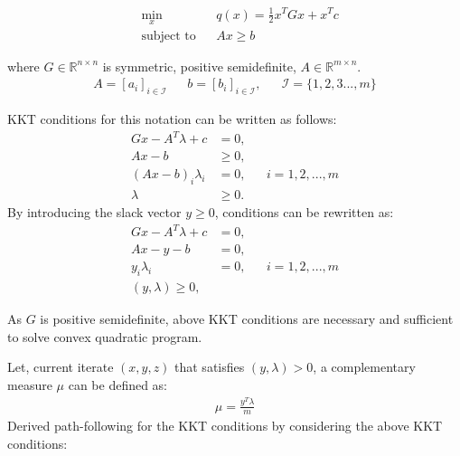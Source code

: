 \begin{equation}
\begin{aligned}
& \underset{x}{\text{min}}
& & q(x)= \frac{1}{2}x^{T}Gx+x^{T}c \\
& \text{subject to} & &  Ax \geqslant b
\end{aligned}
\label{eqn:Path_following_1}
\end{equation}

where $G\in \mathbb{R}^{n\times n}$ is symmetric, positive semidefinite, $A\in \mathbb{R}^{m\times n}$.
\begin{equation*}
	\begin{aligned}
		A = [a_i]_{i\in \mathcal{I}} & & b = [b_i]_{i\in \mathcal{I}}, & & \mathcal{I}=\lbrace 1,2,3...,m \rbrace 
	\end{aligned}
\end{equation*}

KKT conditions for this notation can be written as follows:
\begin{equation}
	\begin{aligned}
		Gx- A^T\lambda + c &= 0,\\
		Ax - b  &\geqslant 0, \\
		(Ax-b)_i\lambda_i &= 0, & & i = 1,2,...,m\\
		\lambda &\geqslant 0.
	\end{aligned}
	\label{eqn:Path_following_2}
\end{equation}
By introducing the slack vector $y \geqslant 0$, conditions can be rewritten as:
\begin{equation}
	\begin{aligned}
		Gx- A^T\lambda + c &= 0,\\
		Ax - y - b  &= 0, \\
		y_i\lambda_i &= 0, & & i=1,2,...,m\\
		(y,\lambda) \geqslant 0,
	\end{aligned}
	\label{eqn:Path_following_3}
\end{equation}

As $G$ is positive semidefinite, above KKT conditions are necessary and sufficient to solve convex quadratic program.

Let, current iterate $(x,y,z)$ that satisfies $(y,\lambda)>0$, a complementary measure $\mu$ can be defined as:
\begin{equation}
	\begin{aligned}
		\mu = \frac{y^T\lambda}{m}
	\end{aligned}
	\label{eqn:Path_following_4}
\end{equation}
Derived path-following for the KKT conditions by considering the above KKT conditions:

